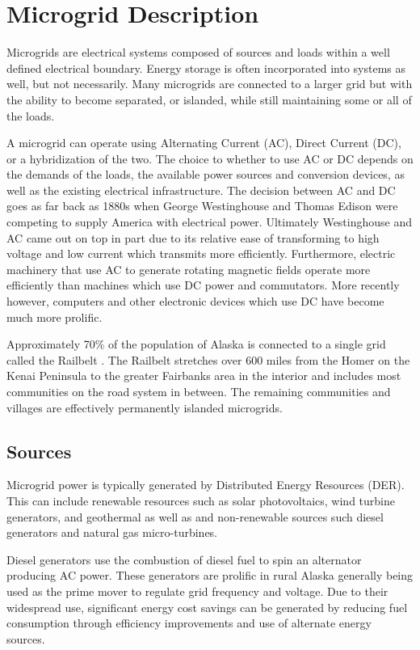 \section{Microgrid Description}
Microgrids are electrical systems composed of sources and loads within a well defined electrical boundary. Energy storage is often incorporated into systems as well, but not necessarily. Many microgrids are connected to a larger grid but with the ability to become separated, or islanded, while still maintaining some or all of the loads.

A microgrid can operate using Alternating Current (AC), Direct Current (DC), or a hybridization of the two. The choice to whether to use AC or DC depends on the demands of the loads, the available power sources and conversion devices, as well as the existing electrical infrastructure. The decision between AC and DC goes as far back as 1880s when George Westinghouse and Thomas Edison were competing to supply America with electrical power. Ultimately Westinghouse and AC came out on top in part due to its relative ease of transforming to high voltage and low current which transmits more efficiently. Furthermore, electric machinery that use AC to generate rotating magnetic fields operate more efficiently than machines which use DC power and commutators. More recently however, computers and other electronic devices which use DC have become much more prolific.  

Approximately 70\% of the population of Alaska is connected to a single grid called the Railbelt \cite{railbelt}. The Railbelt stretches over 600 miles from the Homer on the Kenai Peninsula to the greater Fairbanks area in the interior and includes most communities on the road system in between. The remaining communities and villages are effectively permanently islanded microgrids. 

\subsection{Sources}
Microgrid power is typically generated by Distributed Energy Resources (DER). This can include renewable resources such as solar photovoltaics, wind turbine generators, and geothermal as well as and non-renewable sources such diesel generators and natural gas micro-turbines. 

Diesel generators use the combustion of diesel fuel to spin an alternator producing AC power. These generators are prolific in rural Alaska generally being used as the prime mover to regulate grid frequency and voltage. 
Due to their widespread use, significant energy cost savings can be generated by reducing fuel consumption through efficiency improvements and use of alternate energy sources.

